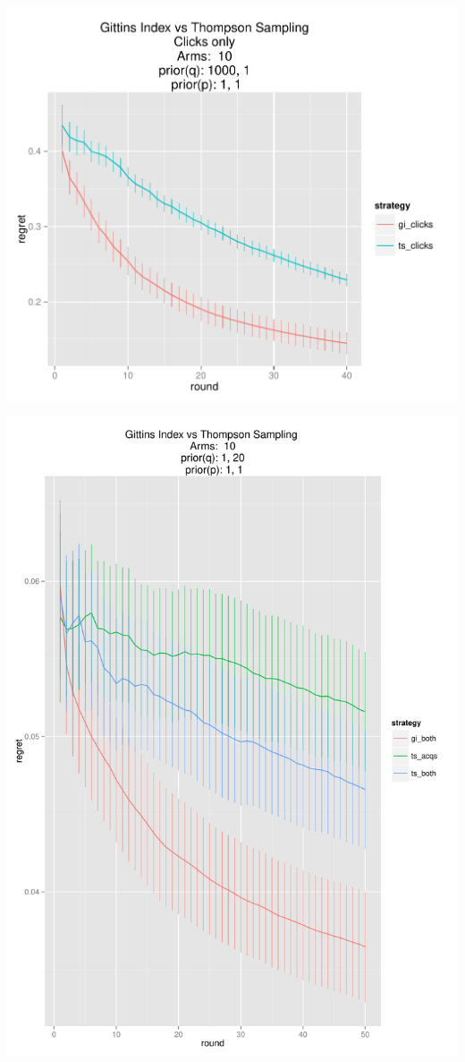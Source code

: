 \documentclass[11pt,a4,singlespacing,titlepagenumber=on]{scrreprt}
\numberwithin{equation}{chapter} %
\theoremstyle{remark}
\begin{document}
\includegraphics[scale=0.7]{GIvsTS.pdf}

\includegraphics[scale=0.7]{GIBoth.pdf}
\end{document}
